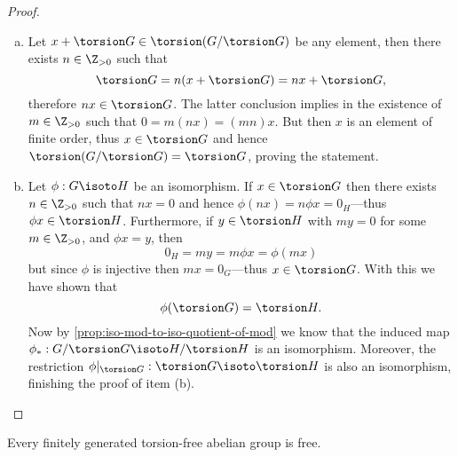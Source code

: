 \begin{proof}
    \begin{enumerate}[(a)]\setlength\itemsep{0em}
        \item Let \(x + \torsion G \in \torsion(G/\torsion G)\) be any element, then
              there exists \(n \in \Z_{>0}\) such that
              \[
                  \torsion G = n(x + \torsion G) = n x + \torsion G,
              \]
              therefore \(n x \in \torsion G\). The latter conclusion implies in the
              existence of \(m \in \Z_{>0}\) such that \(0 = m (n x) = (m n) x\). But then
              \(x\) is an element of finite order, thus \(x \in \torsion G\) and hence
              \(\torsion(G/\torsion G) = \torsion G\), proving the statement.

        \item Let \(\phi: G \isoto H\) be an isomorphism. If \(x \in \torsion G\) then
              there exists \(n \in \Z_{>0}\) such that \(n x = 0\) and hence \(\phi(n x) = n
              \phi x = 0_H\)---thus \(\phi x \in \torsion H\). Furthermore, if \(y \in
              \torsion H\) with \(m y = 0\) for some \(m \in \Z_{> 0}\), and \(\phi x = y\),
              then
              \[
                  0_H = m y = m \phi x = \phi(m x)
              \]
              but since \(\phi\) is injective then \(m x = 0_G\)---thus
              \(x \in \torsion G\). With this we have shown that
              \[
                  \phi(\torsion G) = \torsion H.
              \]
              Now by \cref{prop:iso-mod-to-iso-quotient-of-mod} we know that the induced map
              \(\phi_{*}: G/\torsion G \isoto H/\torsion H\) is an isomorphism. Moreover,
              the restriction \(\phi|_{\torsion G}: \torsion G \isoto \torsion H\) is also
              an isomorphism, finishing the proof of item (b).
    \end{enumerate}
\end{proof}

\begin{theorem}
    \label{thm:finitely-generated-torsion-free-abelian-grp-is-free}
    Every finitely generated torsion-free abelian group is free.
\end{theorem}

